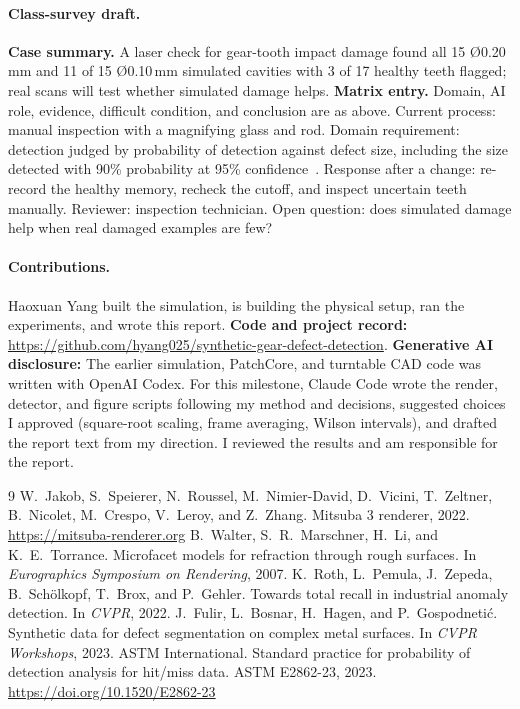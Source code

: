 \documentclass{article}
\begin{document}
\paragraph{Class-survey draft.} \textbf{Case summary.} A laser check for gear-tooth impact damage found all 15 Ø0.20\,mm and 11 of 15 Ø0.10\,mm simulated cavities with 3 of 17 healthy teeth flagged; real scans will test whether simulated damage helps. \textbf{Matrix entry.} Domain, AI role, evidence, difficult condition, and conclusion are as above. Current process: manual inspection with a magnifying glass and rod. Domain requirement: detection judged by probability of detection against defect size, including the size detected with 90\% probability at 95\% confidence~\cite{astm2862}. Response after a change: re-record the healthy memory, recheck the cutoff, and inspect uncertain teeth manually. Reviewer: inspection technician. Open question: does simulated damage help when real damaged examples are few?

\paragraph{Contributions.} Haoxuan Yang built the simulation, is building the physical setup, ran the experiments, and wrote this report. \textbf{Code and project record:} \url{https://github.com/hyang025/synthetic-gear-defect-detection}. \textbf{Generative AI disclosure:} The earlier simulation, PatchCore, and turntable CAD code was written with OpenAI Codex. For this milestone, Claude Code wrote the render, detector, and figure scripts following my method and decisions, suggested choices I approved (square-root scaling, frame averaging, Wilson intervals), and drafted the report text from my direction. I reviewed the results and am responsible for the report.

\small
\begin{thebibliography}{9}
 W.~Jakob, S.~Speierer, N.~Roussel, M.~Nimier-David, D.~Vicini, T.~Zeltner, B.~Nicolet, M.~Crespo, V.~Leroy, and Z.~Zhang. Mitsuba 3 renderer, 2022. \url{https://mitsuba-renderer.org}
 B.~Walter, S.~R.~Marschner, H.~Li, and K.~E.~Torrance. Microfacet models for refraction through rough surfaces. In \emph{Eurographics Symposium on Rendering}, 2007.
 K.~Roth, L.~Pemula, J.~Zepeda, B.~Sch\"olkopf, T.~Brox, and P.~Gehler. Towards total recall in industrial anomaly detection. In \emph{CVPR}, 2022.
 J.~Fulir, L.~Bosnar, H.~Hagen, and P.~Gospodneti\'c. Synthetic data for defect segmentation on complex metal surfaces. In \emph{CVPR Workshops}, 2023.
 ASTM International. Standard practice for probability of detection analysis for hit/miss data. ASTM E2862-23, 2023. \url{https://doi.org/10.1520/E2862-23}
\end{thebibliography}
\end{document}
